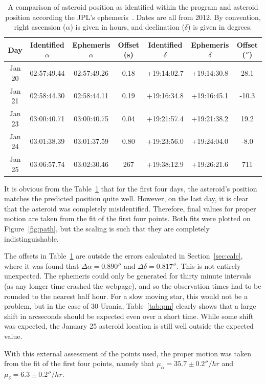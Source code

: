 \documentclass[a4paper,12pt]{article}
\begin{document}
\begin{center}
\begin{table}[!htbp]
  \centering
  \begin{tabular}{c||c||c||c||c||c||c}
  	Day & Identified $\alpha$ & Ephemeris $\alpha$ & Offset (s) & Identified $\delta$ & Ephemeris $\delta$ & Offset ($''$)\\
  	\hline
  	\hline
  	Jan 20 & 02:57:49.44 & 02:57:49.26 & 0.18 & +19:14:02.7 & +19:14:30.8 & 28.1\\
  	\hline
  	Jan 21 & 02:58:44.30 & 02:58:44.11 & 0.19 & +19:16:34.8 & +19:16:45.1 & -10.3\\
  	\hline
  	Jan 23 & 03:00:40.71 & 03:00:40.75 & 0.04 & +19:21:57.4 & +19:21:38.2 & 19.2\\
  	\hline
  	Jan 24 & 03:01:38.39 & 03:01:37.59 & 0.80 & +19:23:56.0 & +19:24:04.0 & -8.0\\
  	\hline
  	Jan 25 & 03:06:57.74 & 03:02:30.46 & 267 & +19:38:12.9 & +19:26:21.6 & 711
   \end{tabular}
    \caption{A comparison of asteroid position as identified within the program and asteroid position according the JPL's ephemeris~\citep{urania}. Dates are all from 2012. By convention, right ascension ($\alpha$) is given in hours, and declination ($\delta$) is given in degrees.}
    \label{tab:position}
\end{table}
\end{center}

It is obvious from the Table~\ref{tab:position} that for the first four days, the asteroid's position matches the predicted position quite well. However, on the last day, it is clear that the asteroid was completely misidentified. Therefore, final values for proper motion are taken from the fit of the first four points. Both fits were plotted on Figure~\ref{fig:path}, but the scaling is such that they are completely indistinguishable.

The offsets in Table~\ref{tab:position} are outside the errors calculated in Section~\ref{sec:calc}, where it was found that $\Delta\alpha = 0.890''$ and $\Delta\delta = 0.817''$. This is not entirely unexpected. The ephemeris could only be generated for thirty minute intervals (as any longer time crashed the webpage), and so the observation times had to be rounded to the nearest half hour. For a slow moving star, this would not be a problem, but in the case of 30 Urania, Table~\ref{tab:pm} clearly shows that a large shift in arcseconds should be expected even over a short time. While some shift was expected, the January 25 asteroid location is still well outside the expected value.

With this external assessment of the points used, the proper motion was taken from the fit of the first four points, namely that $\mu_{\alpha} = 35.7\pm 0.2 ''/hr$ and $\mu_{\delta} = 6.3\pm 0.2 ''/hr$.



\end{document}
